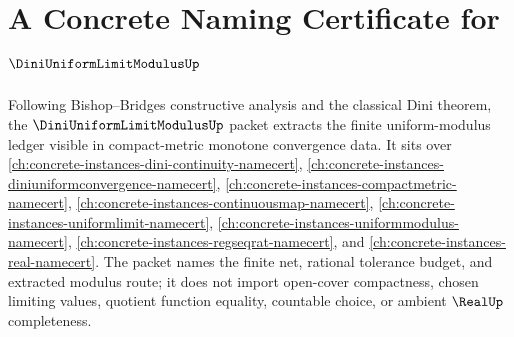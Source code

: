 \chapter{A Concrete Naming Certificate for $\DiniUniformLimitModulusUp$}
\label{ch:concrete-instances-dini-uniform-limit-modulus-namecert}

Following Bishop--Bridges constructive analysis and the classical Dini theorem, the $\DiniUniformLimitModulusUp$ packet extracts the finite uniform-modulus ledger visible in compact-metric monotone convergence data. It sits over \autoref{ch:concrete-instances-dini-continuity-namecert}, \autoref{ch:concrete-instances-diniuniformconvergence-namecert}, \autoref{ch:concrete-instances-compactmetric-namecert}, \autoref{ch:concrete-instances-continuousmap-namecert}, \autoref{ch:concrete-instances-uniformlimit-namecert}, \autoref{ch:concrete-instances-uniformmodulus-namecert}, \autoref{ch:concrete-instances-regseqrat-namecert}, and \autoref{ch:concrete-instances-real-namecert}. The packet names the finite net, rational tolerance budget, and extracted modulus route; it does not import open-cover compactness, chosen limiting values, quotient function equality, countable choice, or ambient $\RealUp$ completeness.

